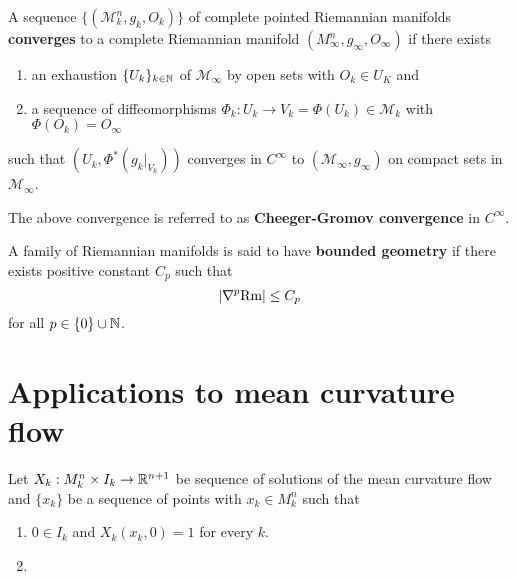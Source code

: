 \begin{defn}
    A sequence $ \{ (\mathcal{M}^{n}_{k},g_{k},O_{k})\} $ of complete pointed Riemannian manifolds \textbf{converges} to a complete Riemannian manifold $ (M_{\infty}^{n}, g_{\infty}, O_{\infty}) $ if there exists \begin{enumerate}
        \item an exhaustion $ \{U_{k}\}_{k \in \mathbb{N}} $ of $ \mathcal{M}_{\infty} $ by open sets with $ O_{k} \in U_{K} $ and 
        \item a sequence of diffeomorphisms $ \Phi_{k} : U_{k} \to V_{k} = \Phi(U_{k}) \in \mathcal{M}_{k} $ with $ \Phi(O_{k}) = O_{\infty} $
    \end{enumerate}
    such that $ (U_{k},\Phi^{*}(g_{k}|_{V_{k}})) $ converges in $ C^{\infty} $ to $ (\mathcal{M}_{\infty}, g_{\infty}) $ on compact sets in $ \mathcal{M}_{\infty} $.
\end{defn}

The above convergence is referred to as \textbf{Cheeger-Gromov convergence} in $ C^{\infty} $.

\begin{defn}
    A family of Riemannian manifolds is said to have \textbf{bounded geometry} if there exists positive constant $ C_{p} $ such that 
    \[ |\nabla^{p} \text{Rm}| \le C_{p} \]
    for all $ p \in \{0\} \cup \mathbb{N} $.
\end{defn}

\begin{thm}
    
\end{thm}
\section{Applications to mean curvature flow}
\begin{thm}\label{Arzela}
    Let $ X_{k} : M_{k}^{n} \times I_{k} \to \mathbb{R}^{n+1} $ be sequence of solutions of the mean curvature flow and $ \{x_{k}\} $ be a sequence of points with $ x_{k} \in M_{k}^{n} $ such that \begin{enumerate}
        \item $ 0 \in I_{k} $ and $ X_{k}(x_{k},0)=1 $ for every $ k $. 
        \item 
    \end{enumerate}
\end{thm}